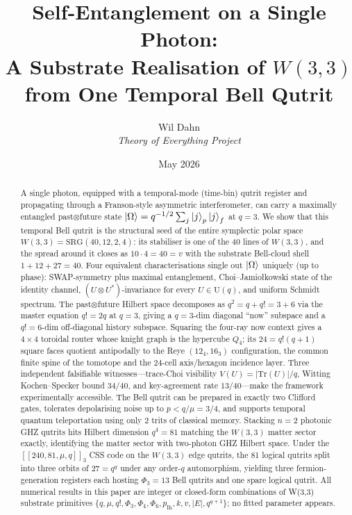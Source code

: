 \documentclass[11pt]{article}
\title{\textbf{Self-Entanglement on a Single Photon:\\
A Substrate Realisation of $W(3,3)$ from One Temporal Bell Qutrit}}
\author{Wil Dahn \\
\normalsize\textit{Theory of Everything Project}}
\date{May 2026}
\newcommand{\SRG}[4]{\mathrm{SRG}(#1,#2,#3,#4)}
\newcommand{\W}{W(3,3)}
\begin{document}
\maketitle

\begin{abstract}
A single photon, equipped with a temporal-mode (time-bin) qutrit register
and propagating through a Franson-style asymmetric interferometer, can
carry a maximally entangled past$\otimes$future state $\ket{\Omega} =
q^{-1/2}\sum_j\ket{j}_p\ket{j}_f$ at $q=3$.  We show that this temporal
Bell qutrit is the structural seed of the entire symplectic polar space
$\W = \SRG{40}{12}{2}{4}$: its stabiliser is one of the 40 lines of
$\W$, and the spread around it closes as $10 \cdot 4 = 40 = v$ with the
substrate Bell-cloud shell $1 + 12 + 27 = 40$.  Four equivalent
characterisations single out $\ket{\Omega}$ uniquely (up to phase):
SWAP-symmetry plus maximal entanglement, Choi--Jamio\l kowski state of
the identity channel, $(U\otimes U^*)$-invariance for every
$U\in\mathrm{U}(q)$, and uniform Schmidt spectrum.  The past$\otimes$future
Hilbert space decomposes as $q^2 = q + q! = 3 + 6$ via the master equation
$q!=2q$ at $q=3$, giving a $q=3$-dim diagonal ``now'' subspace and a
$q!=6$-dim off-diagonal history subspace.  Squaring the four-ray now
context gives a $4\times4$ toroidal router whose knight graph is the
hypercube $Q_4$; its $24=q!(q+1)$ square faces quotient antipodally to
the Reye $(12_4,16_3)$ configuration, the common finite spine of the
tomotope and the $24$-cell axis/hexagon incidence layer.  Three independent falsifiable
witnesses---trace-Choi visibility $V(U) = |\mathrm{Tr}(U)|/q$, Witting
Kochen--Specker bound $34/40$, and key-agreement rate $13/40$---make the
framework experimentally accessible.  The Bell qutrit can be prepared in
exactly two Clifford gates, tolerates depolarising noise up to $p<q/\mu=3/4$,
and supports temporal quantum teleportation using only $2$ trits of
classical memory.  Stacking $n=2$ photonic GHZ qutrits hits Hilbert
dimension $q^4 = 81$ matching the $\W$ matter sector exactly, identifying
the matter sector with two-photon GHZ Hilbert space.  Under the
$[[240, 81, \mu, q]]_3$ CSS code on the $\W$ edge qutrits, the 81 logical
qutrits split into three orbits of $27 = q^q$ under any order-$q$
automorphism, yielding three fermion-generation registers each hosting
$\Phi_3 = 13$ Bell qutrits and one spare logical qutrit.  All numerical
results in this paper are integer or closed-form combinations of W(3,3)
substrate primitives $\{q, \mu, q!, \Phi_3, \Phi_4, \Phi_6, p_{\mathrm{Ih}},
k, v, |E|, q^{q+1}\}$; no fitted parameter appears.
\end{abstract}
\end{document}
